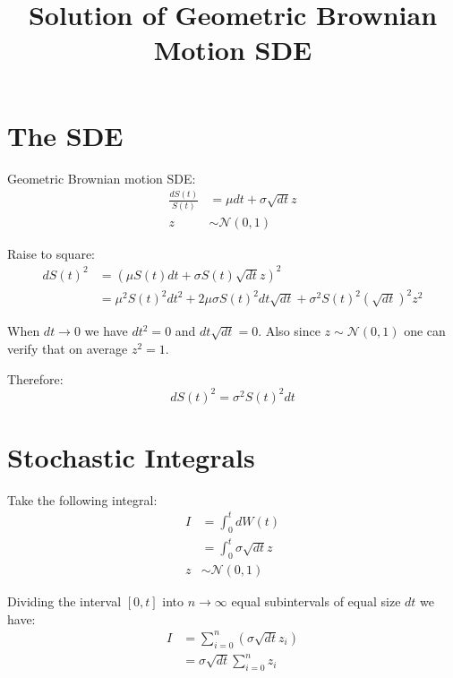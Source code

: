 \documentclass{article}
\begin{document}
\title{Solution of Geometric Brownian Motion SDE}
\maketitle

\section{The SDE}

Geometric Brownian motion SDE:
\begin{equation}
  \begin{aligned}
    \frac{dS(t)}{S(t)} & = \mu dt + \sigma \sqrt{dt} z \\
      z & \sim \mathcal{N}(0,1)
  \end{aligned}
\end{equation}

Raise to square:
\begin{equation}
  \begin{aligned}
    {dS(t)}^2 & = {(\mu S(t) dt + \sigma S(t) \sqrt{dt} z)}^2 \\
    & = {\mu}^2 {S(t)}^2 {dt}^2 + 2 \mu \sigma {S(t)}^2 dt \sqrt{dt} + {\sigma}^2 {S(t)}^2 {(\sqrt{dt})}^2 {z}^2
  \end{aligned}
\end{equation}

When ${dt \to 0}$ we have $dt^2 = 0$ and $dt \sqrt{dt} = 0$. Also since $z \sim \mathcal{N}(0,1)$ one can verify that on average $z^2 = 1$.

Therefore:
\begin{equation}
  {dS(t)}^2 = {\sigma}^2 {S(t)}^2 dt
\end{equation}

\section{Stochastic Integrals}

Take the following integral:
\begin{equation}
  \begin{aligned}
   I & = \int_{0}^{t} dW(t) \\
     & = \int_{0}^{t} \sigma \sqrt{dt} z \\
     z & \sim \mathcal{N}(0,1)
  \end{aligned}
\end{equation}

Dividing the interval $\left[ 0, t \right]$ into $n \to \infty$ equal subintervals of equal size $dt$ we have:
\begin{equation}
  \begin{aligned}
   I & = \sum_{i=0}^{n} \left( \sigma \sqrt{dt} z_{i} \right) \\
     & = \sigma \sqrt{dt} \sum_{i=0}^{n} z_{i}
  \end{aligned}
\end{equation}
\end{document}

